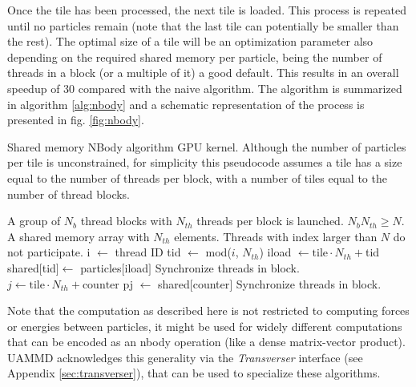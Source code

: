 \documentclass[ twoside,openright,titlepage,numbers=noenddot,%
headinclude,footinclude,cleardoublepage=empty,abstract=on,
BCOR=5mm,paper=a4,fontsize=11pt, dvipsnames
]{scrreprt}
\newcommand{\uammd}{\gls{UAMMD}\xspace}
\begin{document}
Once the tile has been processed, the next tile is loaded. This process is repeated until no particles remain (note that the last tile can potentially be smaller than the rest).
The optimal size of a tile will be an optimization parameter also depending on the required shared memory per particle, being the number of threads in a block (or a multiple of it) a good default.
This results in an overall speedup of 30 compared with the naive algorithm.
The algorithm is summarized in algorithm \ref{alg:nbody} and a schematic representation of the process is presented in fig. \ref{fig:nbody}.
\begin{algorithm}[H]
  \caption{Shared memory NBody algorithm GPU kernel. Although the number of particles per tile is unconstrained, for simplicity this pseudocode assumes a tile has a size equal to the number of threads per block, with a number of tiles equal to the number of thread blocks.} \label{alg:nbody}
  \begin{algorithmic}[1]
    \Require
    \Statex A group of $N_b$ thread blocks with $N_{th}$ threads per block is launched.
    \Statex $N_bN_{th}\ge N$.
    \Statex A shared memory array with $N_{th}$ elements.
    \Ensure
    \Statex Threads with index larger than $N$ do not participate.
    \State i $\gets$ thread ID 
    \State tid $\gets$ mod($i$, $N_{th}$) 
    \State iload $\gets \text{tile}\cdot N_{th}+$tid
    \State shared$[$tid$]\gets$ particles$[$iload$]$
    \State Synchronize threads in block. 
    \State $j \gets \text{tile}\cdot N_{th} + \text{counter}$
    \State pj $\gets$ shared$[$counter$]$
    \EndFor
    \State Synchronize threads in block. 
    \EndFor
  \end{algorithmic}
\end{algorithm}

Note that the computation as described here is not restricted to computing forces or energies between particles, it might be used for widely different computations that can be encoded as an nbody operation (like a dense matrix-vector product).
\uammd acknowledges this generality via the \emph{Transverser} interface (see Appendix \ref{sec:transverser}), that can be used to specialize these algorithms.
\end{document}
